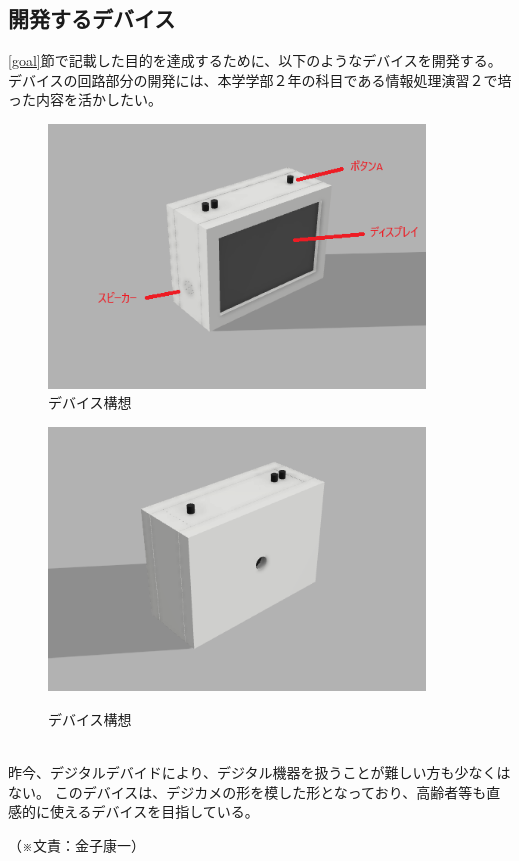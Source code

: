 \documentclass[11pt,a4paper]{report}
\newcommand{\Writer}[1]{
  \normalsize
  \begin{flushright}
    （※文責：#1）
  \end{flushright}
}
\begin{document}
\subsection{開発するデバイス}
\noindent\space
\ref{goal}節で記載した目的を達成するために、以下のようなデバイスを開発する。
デバイスの回路部分の開発には、本学学部２年の科目である情報処理演習２で培った内容を活かしたい。
\begin{figure}[htbp]
  \begin{center}
    \includegraphics[width=100mm]{images/cad1.png}\\
    \caption{デバイス構想}
  \end{center}
  \begin{center}
    \includegraphics[width=100mm]{images/cad2.png}\\
    \caption{デバイス構想}
  \end{center}
\end{figure}\\
昨今、デジタルデバイドにより、デジタル機器を扱うことが難しい方も少なくはない。
このデバイスは、デジカメの形を模した形となっており、高齢者等も直感的に使えるデバイスを目指している。
\Writer{金子康一}

\newpage
\end{document}
